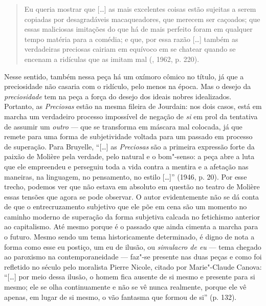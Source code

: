 \begin{quote}
Eu queria mostrar que [\ldots{}] as mais excelentes coisas estão
sujeitas a serem copiadas por desagradáveis macaqueadores, que merecem
ser caçoados; que essas maliciosas imitações do que há de mais perfeito
foram em qualquer tempo matéria para a comédia; e que, por essa razão
[\ldots{}] também as verdadeiras preciosas cairiam em equívoco em se
chatear quando se encenam a ridículas que as imitam mal (, 1962, p. 220).
\end{quote}

Nesse sentido, também nessa peça há um oxímoro cômico no título, já que
a preciosidade não casaria com o ridículo, pelo menos na época. Mas o
desejo da \emph{preciosidade} tem na peça a força do desejo dos ideais
nobres idealizados. Portanto, as \emph{Preciosas} estão na mesma fileira
de Jourdain: nos dois casos, está em marcha um verdadeiro processo
impossível de negação de \emph{si} em prol da tentativa de assumir um
\emph{outro} --- que se transforma em máscara mal colocada, já que remete
para uma forma de subjetividade voltada para um passado em processo de
superação. Para Bruyelle, ``[\ldots{}] as \emph{Preciosas} são a primeira
expressão forte da paixão de Molière pela verdade, pelo natural e o
bom"-senso: a peça abre a luta que ele empreendeu e perseguiu toda a vida
contra a mentira e a afetação nas maneiras, na linguagem, no pensamento,
no estilo [\ldots{}]'' (1946, p. 20). Por esse trecho, podemos ver
que não estava em absoluto em questão no teatro de Molière essas tensões
que agora se pode observar. O autor evidentemente não se dá conta de
que o entrecruzamento subjetivo que ele põe em cena são um momento no
caminho moderno de superação da forma subjetiva calcada no fetichismo
anterior ao capitalismo. Até mesmo porque é o passado que ainda cimenta
a marcha para o futuro. Mesmo sendo um tema historicamente determinado,
é digno de nota a forma como esse eu postiço, um eu de ilusão, ou
\emph{simulacro de eu} --- tema chegado ao paroxismo na contemporaneidade
--- faz"-se presente nas duas peças e como foi refletido no século 
pelo moralista Pierre Nicole, citado por Marie"-Claude Canova:
``[\ldots{}] por meio dessa ilusão, o homem fica ausente de si mesmo
e presente para si mesmo; ele se olha continuamente e não se vê nunca
realmente, porque ele vê apenas, em lugar de si mesmo, o vão fantasma
que formou de si'' (p. 132).

